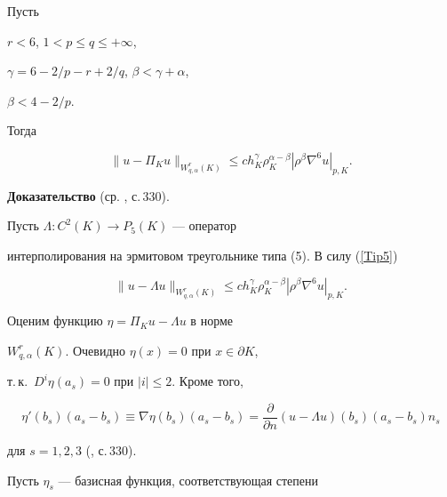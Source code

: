 \begin{thm} \label{Est_Arg}


Пусть 


$r<6$, $1< p \le q \le + \infty$, 


$\gamma = 6-2/p - r+2/q$, $\beta < \gamma+\alpha$, 


$\beta < 4 - 2/p$. 


Тогда 


\begin{equation} \label{EstArg} 


\| {u-\Pi_K u} \|_{W_{q,\alpha }^r( K )}\le 


ch_K^{\gamma}\rho _K^{\alpha -\beta }| {\rho ^\beta 


\nabla ^6u} |_{p,K}.


\end{equation}


\end{thm}





{\bf Доказательство} (ср. \cite{Ciarle}, с.\,330). 


Пусть $\Lambda: C^2(K) \to P_5(K)$ --- оператор


интерполирования на эрмитовом треугольнике типа (5). В силу (\ref{Tip5})


$$


\| {u-\Lambda u} \|_{W_{q,\alpha }^r( K )}\le 


ch_K^{\gamma}\rho _K^{\alpha -\beta }| {\rho ^\beta 


\nabla ^6u} |_{p,K}.


$$


Оценим функцию $\eta = \Pi_K u - \Lambda u$ в норме 


$W_{q,\alpha }^r( K )$. Очевидно $\eta(x) = 0$ при $x\in \partial K$,


т.\,к.~$D^i \eta ( {a_s} )=0 $ при $| {i} | \le 2 $. Кроме того,


$$


\eta '( {b_s} )( {a_s-b_s} )\equiv \nabla 


\eta ( {b_s} )( {a_s-b_s} )=\frac{\partial}


{\partial n}( {u-\Lambda u} )( {b_s} 


)( {a_s-b_s} )n_s


$$


для $s=1, 2,3$ (\cite{Ciarle}, с.\,330).





Пусть $\eta_s$ --- базисная функция, соответствующая степени 


